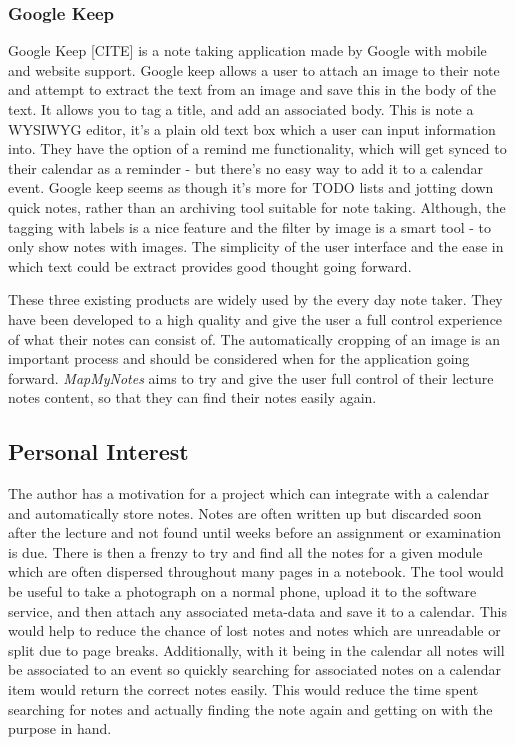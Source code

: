\subsubsection{Google Keep}
Google Keep [CITE] is a note taking application made by Google with mobile and website support. Google keep allows a user to attach an image to their note and attempt to extract the text from an image and save this in the body of the text. It allows you to tag a title, and add an associated body. This is note a WYSIWYG editor, it's a plain old text box which a user can input information into. They have the option of a remind me functionality, which will get synced to their calendar as a reminder - but there's no easy way to add it to a calendar event. Google keep seems as though it's more for TODO lists and jotting down quick notes, rather than an archiving tool suitable for note taking. Although, the tagging with labels is a nice feature  and the filter by image is a smart tool - to only show notes with images. The simplicity of the user interface and the ease in which text could be extract provides good thought going forward.

\begin{flushleft}
These three existing products are widely used by the every day note taker. They have been developed to a high quality and give the user a full control experience of what their notes can consist of. The automatically cropping of an image is an important process and should be considered when for the application going forward. \textit{MapMyNotes} aims to try and give the user full control of their lecture notes content, so that they can find their notes easily again. 
\end{flushleft}


\subsection{Personal Interest}
The author has a motivation for a project which can integrate with a calendar and automatically store notes. Notes are often written up but discarded soon after the lecture and not found until weeks before an assignment or examination is due. There is then a frenzy to try and find all the notes for a given module which are often dispersed throughout many pages in a notebook. The tool would be useful to take a photograph on a normal phone, upload it to the software service, and then attach any associated meta-data and save it to a calendar.  This would help to reduce the chance of lost notes and notes which are unreadable or split due to page breaks. Additionally, with it being in the calendar all notes will be associated to an event so quickly searching for associated notes on a calendar item would return the correct notes easily. This would reduce the time spent searching for notes and actually finding the note again and getting on with the purpose in hand.

